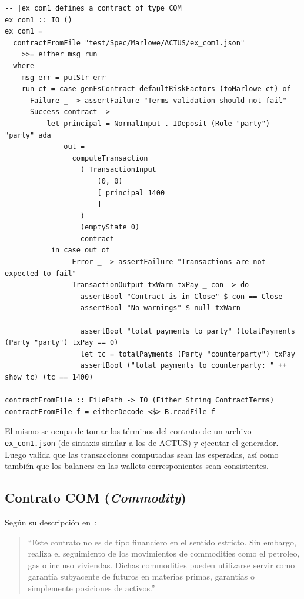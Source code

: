 \documentclass[12pt]{book}
\begin{document}
\begin{lstlisting}[style=Haskell-cardano, caption=Test de ejemplo escrito durante el desarrollo de la tesis para el contrato COM.]
-- |ex_com1 defines a contract of type COM
ex_com1 :: IO ()
ex_com1 =
  contractFromFile "test/Spec/Marlowe/ACTUS/ex_com1.json"
    >>= either msg run
  where
    msg err = putStr err
    run ct = case genFsContract defaultRiskFactors (toMarlowe ct) of
      Failure _ -> assertFailure "Terms validation should not fail"
      Success contract ->
          let principal = NormalInput . IDeposit (Role "party") "party" ada
              out =
                computeTransaction
                  ( TransactionInput
                      (0, 0)
                      [ principal 1400
                      ]
                  )
                  (emptyState 0)
                  contract
           in case out of
                Error _ -> assertFailure "Transactions are not expected to fail"
                TransactionOutput txWarn txPay _ con -> do
                  assertBool "Contract is in Close" $ con == Close
                  assertBool "No warnings" $ null txWarn

                  assertBool "total payments to party" (totalPayments (Party "party") txPay == 0)
                  let tc = totalPayments (Party "counterparty") txPay
                  assertBool ("total payments to counterparty: " ++ show tc) (tc == 1400)

contractFromFile :: FilePath -> IO (Either String ContractTerms)
contractFromFile f = eitherDecode <$> B.readFile f
\end{lstlisting}

El mismo se ocupa de tomar los términos del contrato de un archivo \texttt{ex\_com1.json} (de sintaxis similar a los de ACTUS) y ejecutar el generador. Luego valida que las transacciones computadas sean las esperadas, así como también que los balances en las wallets corresponientes sean consistentes.

\subsection{Contrato COM (\textit{Commodity})}

Según su descripción en~\cite{ACTUS_Dictionary}:

\begin{quote} 
``Este contrato no es de tipo financiero en el sentido estricto. Sin embargo, realiza el seguimiento de los movimientos de commodities como el petroleo, gas o incluso viviendas. Dichas commodities pueden utilizarse servir como garantía subyacente de futuros en materias primas, garantías o simplemente posiciones de activos.''
\end{quote}
\end{document}

